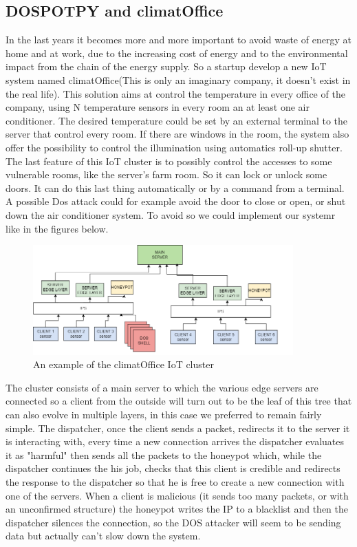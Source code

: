 \subsection{DOSPOTPY and climatOffice}
In the last years it becomes more and more important to avoid waste of energy at home and at work, due to the increasing cost of energy and to the environmental impact from the chain of the energy supply. So a startup develop a new IoT system named climatOffice(This is only an imaginary company, it doesn't exist in the real life). This solution aims at control the temperature in every office of the company, using N temperature sensors in every room an at least one air conditioner. The desired temperature could be set by an external terminal to the server that control every room. If there are windows in the room, the system also offer the possibility to control the illumination using automatics roll-up shutter. The last feature of this IoT cluster is to possibly control the accesses to some vulnerable rooms, like the server's farm room. So it can lock or unlock some doors. It can do this last thing automatically or by a command from a terminal. A possible Dos attack could for example avoid the door to close or open, or shut down the air conditioner system. To avoid so we could implement our systemr like in the figures below.
\begin{figure}[h!]
  \centering
  \includegraphics[width = 10cm]{images/IOTlever2IPS.png}
  \caption{An example of the climatOffice IoT cluster}
  \label{fig:TCPDos}
\end{figure}
\FloatBarrier
\noindent
The cluster consists of a main server to which the various edge servers are connected so a client  from the outside will turn out to be the leaf of this tree that can also evolve in multiple layers, in this case we preferred to remain fairly simple. The dispatcher, once the client sends a packet, redirects it to the server it is interacting with, every time a new connection arrives the dispatcher evaluates it as "harmful" then sends all the packets to the honeypot which, while the dispatcher continues the his job, checks that this client is credible and redirects the response to the dispatcher so that he is free to create a new connection with one of the servers. When a client is malicious (it sends too many packets, or with an unconfirmed structure) the honeypot writes the IP to a blacklist and then the dispatcher silences the connection, so the DOS attacker will seem to be sending data but actually can't slow down the system.
